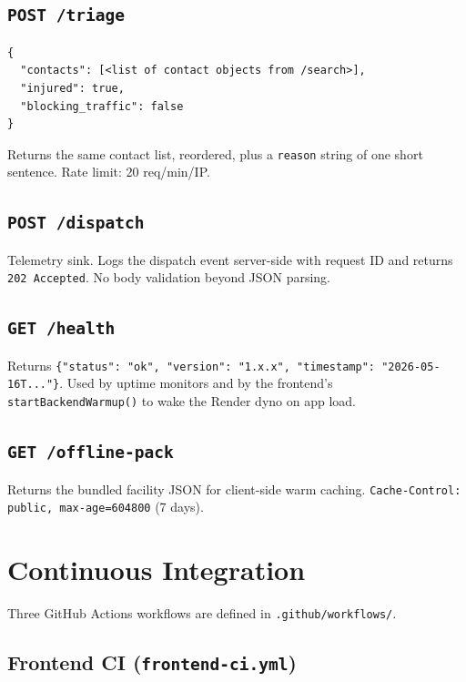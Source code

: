 \documentclass[11pt, a4paper]{article}
\newcommand{\file}[1]{\texttt{\small\color{rsblue}#1}}
\newcommand{\code}[1]{\texttt{\small#1}}
\begin{document}
\subsection{\texttt{POST /triage}}

\begin{lstlisting}[numbers=none,caption={Request body}]
{
  "contacts": [<list of contact objects from /search>],
  "injured": true,
  "blocking_traffic": false
}
\end{lstlisting}

Returns the same contact list, reordered, plus a \code{reason} string of one short sentence. Rate limit: 20 req/min/IP.

\subsection{\texttt{POST /dispatch}}

Telemetry sink. Logs the dispatch event server-side with request ID and returns \code{202 Accepted}. No body validation beyond JSON parsing.

\subsection{\texttt{GET /health}}

Returns \code{\{"status": "ok", "version": "1.x.x", "timestamp": "2026-05-16T..."\}}. Used by uptime monitors and by the frontend's \code{startBackendWarmup()} to wake the Render dyno on app load.

\subsection{\texttt{GET /offline-pack}}

Returns the bundled facility JSON for client-side warm caching. \code{Cache-Control: public, max-age=604800} (7 days).

\section{Continuous Integration}

Three GitHub Actions workflows are defined in \file{.github/workflows/}.

\subsection{Frontend CI (\texttt{frontend-ci.yml})}
\end{document}
